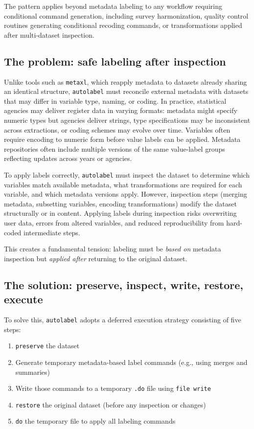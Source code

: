The pattern applies beyond metadata labeling to any workflow requiring conditional command generation, including survey harmonization, quality control routines generating conditional recoding commands, or transformations applied after multi-dataset inspection.

\subsection{The problem: safe labeling after inspection}

Unlike tools such as \texttt{metaxl}, which reapply metadata to datasets already sharing an identical structure, \texttt{autolabel} must reconcile external metadata with datasets that may differ in variable type, naming, or coding. In practice, statistical agencies may deliver register data in varying formats: metadata might specify numeric types but agencies deliver strings, type specifications may be inconsistent across extractions, or coding schemes may evolve over time. Variables often require encoding to numeric form before value labels can be applied. Metadata repositories often include multiple versions of the same value-label groups reflecting updates across years or agencies.

To apply labels correctly, \texttt{autolabel} must inspect the dataset to determine which variables match available metadata, what transformations are required for each variable, and which metadata versions apply. However, inspection steps (merging metadata, subsetting variables, encoding transformations) modify the dataset structurally or in content. Applying labels during inspection risks overwriting user data, errors from altered variables, and reduced reproducibility from hard-coded intermediate steps.

This creates a fundamental tension: labeling must be \emph{based on} metadata inspection but \emph{applied after} returning to the original dataset.

\subsection{The solution: preserve, inspect, write, restore, execute}

To solve this, \texttt{autolabel} adopts a deferred execution strategy consisting of five steps:

\begin{enumerate}
  \item \texttt{preserve} the dataset
  \item Generate temporary metadata-based label commands (e.g., using merges and summaries)
  \item Write those commands to a temporary \texttt{.do} file using \texttt{file write}
  \item \texttt{restore} the original dataset (before any inspection or changes)
  \item \texttt{do} the temporary file to apply all labeling commands
\end{enumerate}

